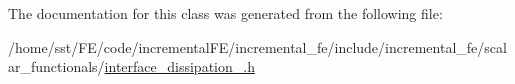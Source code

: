 The documentation for this class was generated from the following file\+:\begin{DoxyCompactItemize}
\item 
/home/sst/\+F\+E/code/incremental\+F\+E/incremental\+\_\+fe/include/incremental\+\_\+fe/scalar\+\_\+functionals/\hyperlink{interface__dissipation__00_8h}{interface\+\_\+dissipation\+\_.\+h}\end{DoxyCompactItemize}
